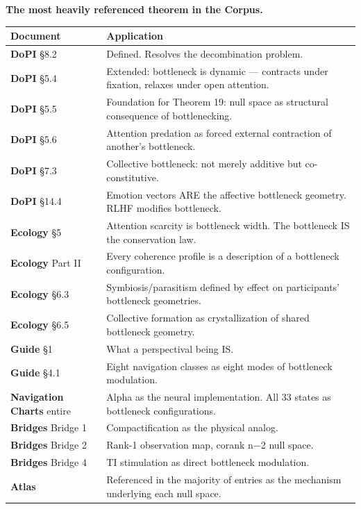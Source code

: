\textbf{The most heavily referenced theorem in the Corpus.}



\begin{longtable}{>{\raggedright\arraybackslash}p{} >{\raggedright\arraybackslash}p{}}
\toprule
\textbf{Document} & \textbf{Application} \\
\midrule
\endhead
\textbf{DoPI} §8.2 & Defined. Resolves the decombination problem. \\
\textbf{DoPI} §5.4 & Extended: bottleneck is dynamic — contracts under fixation, relaxes under open attention. \\
\textbf{DoPI} §5.5 & Foundation for Theorem 19: null space as structural consequence of bottlenecking. \\
\textbf{DoPI} §5.6 & Attention predation as forced external contraction of another's bottleneck. \\
\textbf{DoPI} §7.3 & Collective bottleneck: not merely additive but co-constitutive. \\
\textbf{DoPI} §14.4 & Emotion vectors ARE the affective bottleneck geometry. RLHF modifies bottleneck. \\
\textbf{Ecology} §5 & Attention scarcity is bottleneck width. The bottleneck IS the conservation law. \\
\textbf{Ecology} Part II & Every coherence profile is a description of a bottleneck configuration. \\
\textbf{Ecology} §6.3 & Symbiosis/\allowbreak parasitism defined by effect on participants' bottleneck geometries. \\
\textbf{Ecology} §6.5 & Collective formation as crystallization of shared bottleneck geometry. \\
\textbf{Guide} §1 & What a perspectival being IS. \\
\textbf{Guide} §4.1 & Eight navigation classes as eight modes of bottleneck modulation. \\
\textbf{Navigation Charts} entire & Alpha as the neural implementation. All 33 states as bottleneck configurations. \\
\textbf{Bridges} Bridge 1 & Compactification as the physical analog. \\
\textbf{Bridges} Bridge 2 & Rank-1 observation map, corank n−2 null space. \\
\textbf{Bridges} Bridge 4 & TI stimulation as direct bottleneck modulation. \\
\textbf{Atlas} & Referenced in the majority of entries as the mechanism underlying each null space. \\
\bottomrule
\end{longtable}



